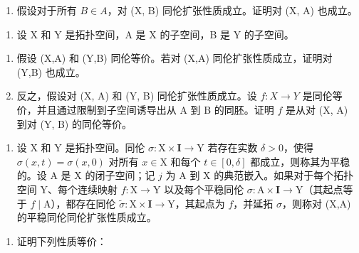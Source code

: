 \begin{enumerate}
\def\labelenumi{\alph{enumi})}
\setcounter{enumi}{1}
\tightlist
\item
  假设对于所有 \(B \in A\)，对 (X, B) 同伦扩张性质成立。证明对 (X, A) 也成立。
\end{enumerate}

\begin{enumerate}
\def\labelenumi{\arabic{enumi})}
\setcounter{enumi}{21}
\tightlist
\item
  设 X 和 Y 是拓扑空间，A 是 X 的子空间，B 是 Y 的子空间。
\end{enumerate}

\begin{enumerate}
\def\labelenumi{\alph{enumi})}
\item
  假设 (X,A) 和 (Y,B) 同伦等价。若对 (X,A) 同伦扩张性质成立，证明对 (Y,B) 也成立。
\item
  反之，假设对 (X, A) 和 (Y, B) 同伦扩张性质成立。设 \(f \colon X \to Y\) 是同伦等价，并且通过限制到子空间诱导出从 A 到 B 的同胚。证明 \(f\) 是从对 (X, A) 到对 (Y, B) 的同伦等价。
\end{enumerate}

\begin{enumerate}
\def\labelenumi{\arabic{enumi})}
\setcounter{enumi}{22}
\tightlist
\item
  设 X 和 Y 是拓扑空间。同伦 \(\sigma\colon\mathrm{X}\times\mathbf{I}\to\mathrm{Y}\) 若存在实数 \(\delta>0\)，使得 \(\sigma(x,t)=\sigma(x,0)\) 对所有 \(x\in\mathrm{X}\) 和每个 \(t\in[0,\delta]\) 都成立，则称其为平稳的。设 A 是 X 的闭子空间；记 \(j\) 为 A 到 X 的典范嵌入。如果对于每个拓扑空间 Y、每个连续映射 \(f\colon\mathrm{X}\to\mathrm{Y}\) 以及每个平稳同伦 \(\sigma\colon\mathrm{A}\times\mathbf{I}\to\mathrm{Y}\)（其起点等于 \(f\mid\mathrm{A}\)），都存在同伦 \(\widetilde{\sigma}\colon\mathrm{X}\times\mathbf{I}\to\mathrm{Y}\)，其起点为 \(f\)，并延拓 \(\sigma\)，则称对 (X,A) 的平稳同伦同伦扩张性质成立。
\end{enumerate}

\begin{enumerate}
\def\labelenumi{\alph{enumi})}
\tightlist
\item
  证明下列性质等价：
\end{enumerate}

